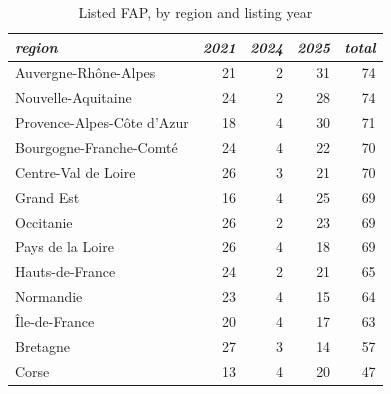 \begin{table}[h!]
\centering
\begin{tabular}{l|rrr|r}
\caption{Listed FAP, by region and listing year} 

\textit{region} & \textit{2021} & \textit{2024} & \textit{2025} & \textit{total} \\ 
  \midrule
Auvergne-Rhône-Alpes &  21 &   2 &  31 &  74 \\ 
  Nouvelle-Aquitaine &  24 &   2 &  28 &  74 \\ 
  Provence-Alpes-Côte d'Azur &  18 &   4 &  30 &  71 \\ 
  Bourgogne-Franche-Comté &  24 &   4 &  22 &  70 \\ 
  Centre-Val de Loire &  26 &   3 &  21 &  70 \\ 
  Grand Est &  16 &   4 &  25 &  69 \\ 
  Occitanie &  26 &   2 &  23 &  69 \\ 
  Pays de la Loire &  26 &   4 &  18 &  69 \\ 
  Hauts-de-France &  24 &   2 &  21 &  65 \\ 
  Normandie &  23 &   4 &  15 &  64 \\ 
  Île-de-France &  20 &   4 &  17 &  63 \\ 
  Bretagne &  27 &   3 &  14 &  57 \\ 
  Corse &  13 &   4 &  20 &  47 \\ 
   \bottomrule
\end{tabular}
\end{table}
